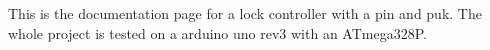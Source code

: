 This is the documentation page for a lock controller with a pin and puk. The whole project is tested on a arduino uno rev3 with an ATmega328P. 